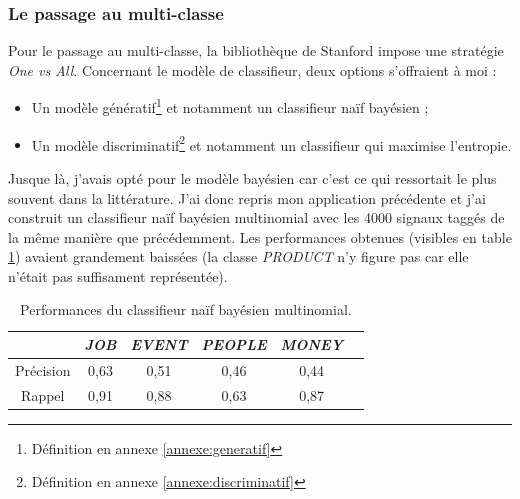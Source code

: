             \subsubsection{Le passage au multi-classe}
                Pour le passage au multi-classe, la bibliothèque de Stanford impose une stratégie \textit{One vs All}. Concernant le modèle de classifieur, deux options s'offraient à moi :
                \begin{itemize}
                    \item Un modèle génératif\footnote{Définition en annexe \ref{annexe:generatif}} et notamment un classifieur naïf bayésien ;
                    \item Un modèle discriminatif\footnote{Définition en annexe \ref{annexe:discriminatif}} et notamment un classifieur qui maximise l'entropie.
                \end{itemize}
                Jusque là, j'avais opté pour le modèle bayésien car c'est ce qui ressortait le plus souvent dans la littérature. J'ai donc repris mon application précédente et j'ai construit un classifieur naïf bayésien multinomial avec les 4000 signaux taggés de la même manière que précédemment. Les performances obtenues (visibles en table \ref{tab:classif_perf2}) avaient grandement baissées (la classe \textit{PRODUCT} n'y figure pas car elle n'était pas suffisament représentée).
                \begin{table}[h]
                    \centering
                    \begin{tabular}{| c | c | c | c | c | c |}
                        \hline
                         & \textit{JOB} & \textit{EVENT} & \textit{PEOPLE} & \textit{MONEY} \\
                        \hline
                        Précision & 0,63 & 0,51 & 0,46 & 0,44 \\
                        Rappel & 0,91 & 0,88 & 0,63 & 0,87 \\
                        \hline
                    \end{tabular}
                    \caption{Performances du classifieur naïf bayésien multinomial.}
                    \label{tab:classif_perf2}
                \end{table}

